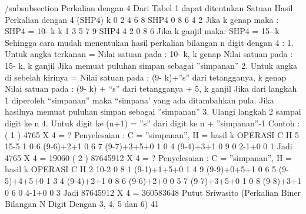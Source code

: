 /subsubsection {Perkalian dengan 4}
Dari Tabel 1 dapat ditentukan
Satuan Hasil Perkalian dengan 4 (SHP4)
k 0 2 4 6 8
SHP4 0 8 6 4 2
Jika k genap maka :
SHP4 = 10- k
k 1 3 5 7 9
SHP4 4 2 0 8 6
Jika k ganjil maka:
SHP4 = 15- k
Sehingga cara mudah menentukan hasil
perkalian bilangan n digit dengan 4 :
1. Untuk angka terkanan =
Nilai satuan pada : 10- k, k genap
Nilai satuan pada : 15- k, k ganjil
Jika memuat puluhan simpan sebagai
”simpanan”
2. Untuk angka di sebelah kirinya =
Nilai satuan pada : (9- k)+”s” dari
tetangganya, k genap
Nilai satuan pada : (9- k) + “s” dari
tetangganya + 5, k ganjil
Jika dari langkah 1 diperoleh
“simpanan” maka “simpana’ yang ada
ditambahkan pula.
Jika hasilnya memuat puluhan simpan
sebagai ”simpanan”
3. Ulangi langkah 2 sampai digit ke n
4. Untuk digit ke (n+1) =
”s” dari digit ke n + ”simpanan”-1
Contoh :
( 1 ) 4765 X 4 = ?
Penyelesaian :
C = ”simpanan”, H = hasil
k OPERASI C H
5 15-5 1 0
6 (9-6)+2+1 0 6
7 (9-7)+3+5+0 1 0
4 (9-4)+3+1 0 9
0 2-1+0 0 1
Jadi 4765 X 4 = 19060
( 2 ) 87645912 X 4 = ?
Penyelesaian :
C = ”simpanan”, H = hasil
k OPERASI C H
2 10-2 0 8
1 (9-1)+1+5+0 1 4
9 (9-9)+0+5+1 0 6
5 (9-5)+4+5+0 1 3
4 (9-4)+2+1 0 8
6 (9-6)+2+0 0 5
7 (9-7)+3+5+0 1 0
8 (9-8)+3+1 0 6
0 4-1+0 0 3
Jadi 87645912 X 4 = 360583648
Putut Sriwasito (Perkalian Biner Bilangan N Digit Dengan 3, 4, 5 dan 6)
41

